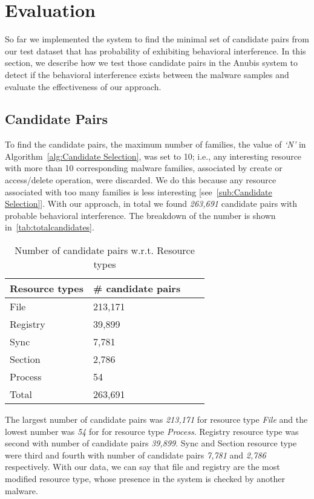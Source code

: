 \chapter{Evaluation}
\label{chapter:evaluation}
So far we implemented the system to find the minimal set of candidate pairs from our test dataset that has probability of exhibiting behavioral interference.
In this section, we describe how we test those candidate pairs in the Anubis system to detect if the behavioral interference exists between the malware samples and evaluate the effectiveness of our approach.
\section{Candidate Pairs}
\label{sec:Candidate Pairs}
To find the candidate pairs, the maximum number of families, the value of \emph{`N'} in Algorithm~\autoref{alg:Candidate Selection}, was set to 10;
i.e., any interesting resource with more than 10 corresponding malware families, associated by create or access/delete operation, were discarded.
We do this because any resource associated with too many families is less interesting [see~\autoref{sub:Candidate Selection}].
With our approach, in total we found \emph{263,691} candidate pairs with probable behavioral interference.
The breakdown of the number is shown in~\autoref{tab:totalcandidates}.

\begin{table}[ht]
  \caption[Number of probable candidate pairs w.r.t. Resource types]{Number of candidate pairs w.r.t. Resource types}\label{tab:totalcandidates}
  \centering
  \begin{tabular}{l l l l}
    \toprule
    Resource types & \# candidate pairs\\
    \midrule
    File & 213,171 \\
    Registry & 39,899 \\
    Sync & 7,781 \\
    Section & 2,786 \\
    Process & 54\\
    \bottomrule
    Total & 263,691\\
  \end{tabular}
\end{table}
The largest number of candidate pairs was \emph{213,171} for resource type \emph{File} and the lowest number was \emph{54} for for resource type \emph{Process}.
Registry resource type was second with number of candidate pairs \emph{39,899}.
Sync and Section resource type were third and fourth with number of candidate pairs \emph{7,781} and \emph{2,786} respectively.
With our data, we can say that file and registry are the most modified resource type, whose presence in the system is checked by another malware.\\


